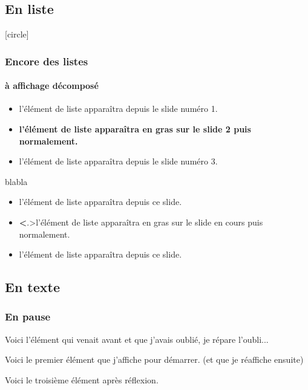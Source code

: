 \documentclass[slidetop,11pt]{beamer}
\begin{document}
\subsection{En liste}
[circle] 
\begin{frame}
 \frametitle{Encore des listes}
 \framesubtitle{à affichage décomposé}
  \begin{itemize}
    \item<1-> l'élément de liste apparaîtra depuis le slide numéro 1.
    \item<2-> \textbf<2>{l'élément de liste apparaîtra en gras sur le slide 2 puis normalement.}
    \item<3-> l'élément de liste apparaîtra depuis le slide numéro 3.  
  \end{itemize}
 blabla
\pause[6]

  \begin{itemize}[<+->]
    \item l'élément de liste apparaîtra depuis ce slide.
    \item \textbf<.>{l'élément de liste apparaîtra en gras sur le slide en cours puis normalement.}
    \item l'élément de liste apparaîtra depuis ce slide.  
  \end{itemize}
\end{frame}
\subsection{En texte}  
\begin{frame}
 \frametitle{En pause}
    \pause
    Voici l'élément qui venait avant et que j'avais oublié, je répare l'oubli...
    
    Voici le premier élément que j'affiche 
    pour démarrer. (et que je réaffiche ensuite)
    \pause[4]
    
    Voici le troisième élément après réflexion.
\end{frame}
\end{document}
